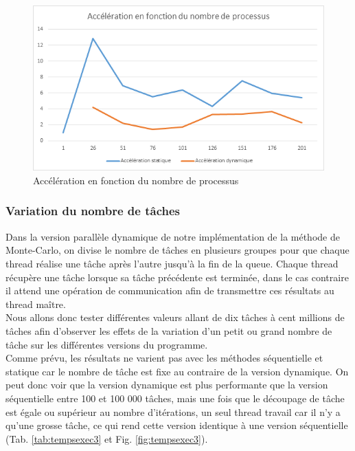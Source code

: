 \documentclass[a4paper,12pt]{article}
\begin{document}
\begin{figure}[H]
\center \includegraphics[width=15cm]{acc2} %
\caption{Accélération en fonction du nombre de processus}
\label{fig:acc2}
\end{figure}


\subsubsection{Variation du nombre de tâches}
Dans la version parallèle dynamique de notre implémentation de la méthode de Monte-Carlo, on divise le nombre de tâches en plusieurs groupes pour que chaque thread réalise une tâche après l'autre jusqu'à la fin de la queue. Chaque thread récupère une tâche lorsque sa tâche précédente est terminée, dans le cas contraire il attend une opération de communication afin de transmettre ces résultats au thread maître. \\
Nous allons donc tester différentes valeurs allant de dix tâches à cent millions de tâches afin d'observer les effets de la variation d'un petit ou grand nombre de tâche sur les différentes versions du programme.\\
Comme prévu, les résultats ne varient pas avec les méthodes séquentielle et statique car le nombre de tâche est fixe au contraire de la version dynamique. On peut donc voir que la version dynamique est plus performante que la version séquentielle entre 100 et 100 000 tâches, mais une fois que le découpage de tâche est égale ou supérieur au nombre d'itérations, un seul thread travail car il n'y a qu'une grosse tâche, ce qui rend cette version identique à une version séquentielle (Tab. \ref{tab:tempsexec3} et Fig. \ref{fig:tempsexec3}). 
\end{document}
